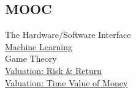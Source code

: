 \documentclass[]{deedy}
\begin{document}
\begin{minipage}[t]{0.27\textwidth}
\begin{flushleft}
\subsection{MOOC}
The Hardware/Software Interface\\
\vspace{1.5pt}
\href{https://www.coursera.org/account/accomplishments/certificate/7V2KZSKAL7ZJ}{Machine Learning}\\
\vspace{1.5pt}
Game Theory\\
\vspace{1.5pt}
\href{https://www.coursera.org/account/accomplishments/certificate/98ZD8GFQ8BMS}{Valuation: Risk \& Return}\\
\vspace{1.5pt}
\href{https://www.coursera.org/account/accomplishments/certificate/P637RR9C8B7T}{Valuation: Time Value of Money}
\sectionsep
%
\end{flushleft}
\end{minipage}
\hfill
%
\end{document}
